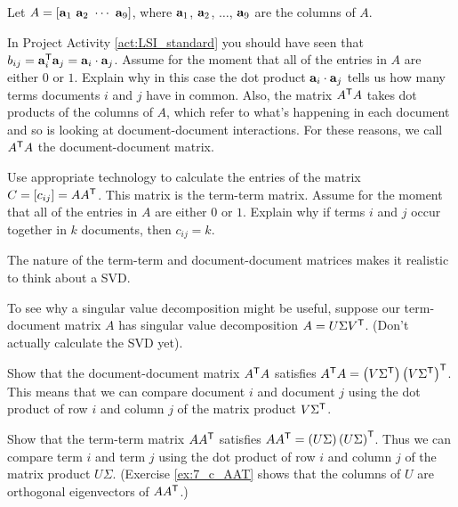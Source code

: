 \begin{pactivity} \label{act:LSI_tt_dd} Let $A = [ \mathbf{a}_1 \ \mathbf{a}_2 \ \cdots \ \mathbf{a}_9]$, where $\mathbf{a}_1$, $\mathbf{a}_2$, $\ldots$, $\mathbf{a}_9$ are the columns of $A$.
\ba
\item In Project Activity \ref{act:LSI_standard} you should have seen that $b_{ij} = \mathbf{a}_i^{\mathsf{T}} \mathbf{a}_j = \mathbf{a}_i \cdot \mathbf{a}_j$. Assume for the moment that all of the entries in $A$ are either $0$ or $1$. Explain why in this case the dot product $\mathbf{a}_i \cdot \mathbf{a}_j$ tells us how many terms documents $i$ and $j$ have in common. Also, the matrix $A^{\mathsf{T}}A$ takes dot products of the columns of $A$, which refer to what's happening in each document and so is looking at document-document interactions. For these reasons, we call $A^{\mathsf{T}}A$ the document-document matrix. 

\item Use appropriate technology to calculate the entries of the matrix $C = [c_{ij}] = AA^{\mathsf{T}}$.  This matrix is the term-term matrix. Assume for the moment that all of the entries in $A$ are either $0$ or $1$. Explain why if terms $i$ and $j$ occur together in $k$ documents, then $c_{ij} =k$. 


\ea

\end{pactivity} 

The nature of the term-term and document-document matrices makes it realistic to think about a SVD. 


\begin{pactivity} \label{act:LSI_ATA_AAT} To see why a singular value decomposition might be useful, suppose our term-document matrix $A$ has singular value decomposition $A = U \Sigma V^{\mathsf{T}}$. (Don't actually calculate the SVD yet). 
\ba
\item Show that the document-document matrix $A^{\mathsf{T}}A$ satisfies  $A^{\mathsf{T}}A = \left(V \Sigma^{\mathsf{T}}\right) \left(V\Sigma^{\mathsf{T}}\right)^{\mathsf{T}}$. This means that we can compare document $i$ and document $j$ using the dot product of row $i$ and column $j$ of the matrix product $V\Sigma^{\mathsf{T}}$. 


\item Show that the term-term matrix $AA^{\mathsf{T}}$ satisfies $AA^{\mathsf{T}} =  \left(U \Sigma\right) \left(U\Sigma\right)^{\mathsf{T}}$. Thus we can compare term $i$ and term $j$ using the dot product of row $i$ and column $j$ of the matrix product $U\Sigma$. (Exercise \ref{ex:7_c_AAT} shows that the columns of $U$ are orthogonal eigenvectors of $AA^{\mathsf{T}}$.)


\ea

\end{pactivity}



